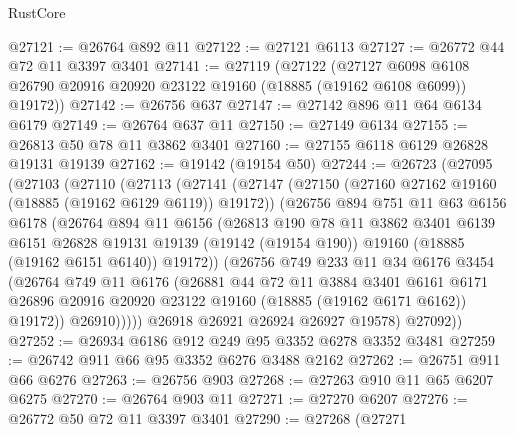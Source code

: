 \begin{lexlean}{RustCore}
\begin{coremodule}
@27121 := @26764 @892 @11
@27122 := @27121 @6113
@27127 := @26772 @44 @72 @11 @3397 @3401
@27141 := @27119
    (@27122
      (@27127 @6098 @6108 @26790 @20916 @20920 @23122 @19160 (@18885 (@19162 @6108 @6099)) @19172))
@27142 := @26756 @637
@27147 := @27142 @896 @11 @64 @6134 @6179
@27149 := @26764 @637 @11
@27150 := @27149 @6134
@27155 := @26813 @50 @78 @11 @3862 @3401
@27160 := @27155 @6118 @6129 @26828 @19131 @19139
@27162 := @19142 (@19154 @50)
@27244 := @26723
    (@27095
      (@27103
        (@27110
          (@27113
            (@27141
              (@27147
                (@27150 (@27160 @27162 @19160 (@18885 (@19162 @6129 @6119)) @19172))
                (@26756
                  @894
                  @751
                  @11
                  @63
                  @6156
                  @6178
                  (@26764
                    @894
                    @11
                    @6156
                    (@26813
                      @190
                      @78
                      @11
                      @3862
                      @3401
                      @6139
                      @6151
                      @26828
                      @19131
                      @19139
                      (@19142 (@19154 @190))
                      @19160
                      (@18885 (@19162 @6151 @6140))
                      @19172))
                  (@26756
                    @749
                    @233
                    @11
                    @34
                    @6176
                    @3454
                    (@26764
                      @749
                      @11
                      @6176
                      (@26881
                        @44
                        @72
                        @11
                        @3884
                        @3401
                        @6161
                        @6171
                        @26896
                        @20916
                        @20920
                        @23122
                        @19160
                        (@18885 (@19162 @6171 @6162))
                        @19172))
                    @26910)))))
          @26918
          @26921
          @26924
          @26927
          @19578)
        @27092))
@27252 := @26934 @6186 @912 @249 @95 @3352 @6278 @3352 @3481
@27259 := @26742 @911 @66 @95 @3352 @6276 @3488 @2162
@27262 := @26751 @911 @66 @6276
@27263 := @26756 @903
@27268 := @27263 @910 @11 @65 @6207 @6275
@27270 := @26764 @903 @11
@27271 := @27270 @6207
@27276 := @26772 @50 @72 @11 @3397 @3401
@27290 := @27268
    (@27271

\end{coremodule}
\end{lexlean}
